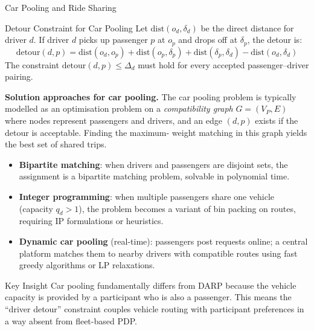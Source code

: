 \documentclass[aspectratio=169,10pt]{beamer}
\begin{document}
\begin{frame}[allowframebreaks]{Car Pooling and Ride Sharing}
  \begin{block}{Detour Constraint for Car Pooling}
    Let $\text{dist}(o_d, \delta_d)$ be the direct distance for driver $d$.
    If driver $d$ picks up passenger $p$ at $o_p$ and drops off at $\delta_p$,
    the detour is:
    \[
      \text{detour}(d, p) = \text{dist}(o_d, o_p) + \text{dist}(o_p, \delta_p)
                           + \text{dist}(\delta_p, \delta_d) - \text{dist}(o_d, \delta_d)
    \]
    The constraint $\text{detour}(d,p) \leq \Delta_d$ must hold for every
    accepted passenger--driver pairing.
  \end{block}

  \framebreak

  \textbf{Solution approaches for car pooling.}  The car pooling problem
  is typically modelled as an optimisation problem on a \emph{compatibility
  graph} $G=(V_P, E)$ where nodes represent passengers and drivers, and an
  edge $(d, p)$ exists if the detour is acceptable.  Finding the maximum-
  weight matching in this graph yields the best set of shared trips.

  \begin{itemize}
    \item \textbf{Bipartite matching}: when drivers and passengers are
          disjoint sets, the assignment is a bipartite matching problem,
          solvable in polynomial time.
    \item \textbf{Integer programming}: when multiple passengers share one
          vehicle (capacity $q_d > 1$), the problem becomes a variant of
          bin packing on routes, requiring IP formulations or heuristics.
    \item \textbf{Dynamic car pooling} (real-time): passengers post requests
          online; a central platform matches them to nearby drivers with
          compatible routes using fast greedy algorithms or LP relaxations.
  \end{itemize}

  \begin{alertblock}{Key Insight}
    Car pooling fundamentally differs from DARP because the vehicle capacity
    is provided by a participant who is also a passenger.  This means the
    ``driver detour'' constraint couples vehicle routing with participant
    preferences in a way absent from fleet-based PDP.
  \end{alertblock}

\end{frame}
\end{document}
